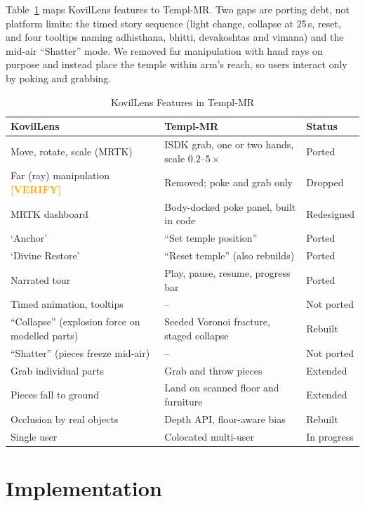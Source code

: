 \documentclass[conference]{IEEEtran}
\newcommand{\VERIFY}[1]{\textcolor{orange}{\textbf{[VERIFY#1]}}}
\begin{document}
Table~\ref{tab:features} maps KovilLens features to Templ-MR. Two gaps are porting debt, not platform limits: the timed story sequence (light change, collapse at 25\,s, reset, and four tooltips naming adhisthana, bhitti, devakoshtas and vimana) and the mid-air ``Shatter'' mode. We removed far manipulation with hand rays on purpose and instead place the temple within arm's reach, so users interact only by poking and grabbing.

\begin{table}[t]
\caption{KovilLens Features in Templ-MR}
\label{tab:features}
\centering\footnotesize
\setlength{\tabcolsep}{3pt}
\begin{tabular}{@{}p{2.55cm}p{3.6cm}p{1.45cm}@{}}
\toprule
\textbf{KovilLens} & \textbf{Templ-MR} & \textbf{Status} \\
\midrule
Move, rotate, scale (MRTK) & ISDK grab, one or two hands, scale $0.2$--$5\times$ & Ported \\
Far (ray) manipulation \VERIFY{} & Removed; poke and grab only & Dropped \\
MRTK dashboard & Body-docked poke panel, built in code & Redesigned \\
`Anchor' & ``Set temple position'' & Ported \\
`Divine Restore' & ``Reset temple'' (also rebuilds) & Ported \\
Narrated tour & Play, pause, resume, progress bar & Ported \\
Timed animation, tooltips & -- & Not ported \\
``Collapse'' (explosion force on modelled parts) & Seeded Voronoi fracture, staged collapse & Rebuilt \\
``Shatter'' (pieces freeze mid-air) & -- & Not ported \\
Grab individual parts & Grab and throw pieces & Extended \\
Pieces fall to ground & Land on scanned floor and furniture & Extended \\
Occlusion by real objects & Depth API, floor-aware bias & Rebuilt \\
Single user & Colocated multi-user & In progress \\
\bottomrule
\end{tabular}
\end{table}

\section{Implementation}\label{sec:impl}
\end{document}
